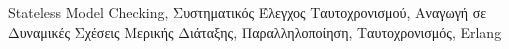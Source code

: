 Stateless Model Checking, Συστηματικός Έλεγχος Ταυτοχρονισμού, Αναγωγή σε Δυναμικές Σχέσεις Μερικής Διάταξης, Παραλληλοποίηση, Ταυτοχρονισμός, Erlang